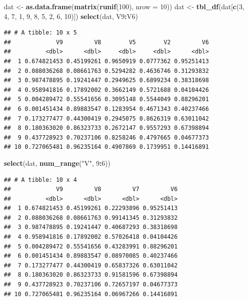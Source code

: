 \documentclass[]{book}
\newenvironment{Shaded}{\begin{snugshade}}{\end{snugshade}}
\newcommand{\KeywordTok}[1]{\textcolor[rgb]{0.13,0.29,0.53}{\textbf{#1}}}
\newcommand{\DataTypeTok}[1]{\textcolor[rgb]{0.13,0.29,0.53}{#1}}
\newcommand{\DecValTok}[1]{\textcolor[rgb]{0.00,0.00,0.81}{#1}}
\newcommand{\StringTok}[1]{\textcolor[rgb]{0.31,0.60,0.02}{#1}}
\newcommand{\OperatorTok}[1]{\textcolor[rgb]{0.81,0.36,0.00}{\textbf{#1}}}
\newcommand{\NormalTok}[1]{#1}
\begin{document}
\begin{Shaded}
\begin{Highlighting}[]
\NormalTok{dat <-}\StringTok{ }\KeywordTok{as.data.frame}\NormalTok{(}\KeywordTok{matrix}\NormalTok{(}\KeywordTok{runif}\NormalTok{(}\DecValTok{100}\NormalTok{), }\DataTypeTok{nrow =} \DecValTok{10}\NormalTok{))}
\NormalTok{dat <-}\StringTok{ }\KeywordTok{tbl_df}\NormalTok{(dat[}\KeywordTok{c}\NormalTok{(}\DecValTok{3}\NormalTok{, }\DecValTok{4}\NormalTok{, }\DecValTok{7}\NormalTok{, }\DecValTok{1}\NormalTok{, }\DecValTok{9}\NormalTok{, }\DecValTok{8}\NormalTok{, }\DecValTok{5}\NormalTok{, }\DecValTok{2}\NormalTok{, }\DecValTok{6}\NormalTok{, }\DecValTok{10}\NormalTok{)])}
\KeywordTok{select}\NormalTok{(dat, V9}\OperatorTok{:}\NormalTok{V6)}
\end{Highlighting}
\end{Shaded}

\begin{verbatim}
## # A tibble: 10 x 5
##             V9         V8        V5        V2         V6
##          <dbl>      <dbl>     <dbl>     <dbl>      <dbl>
##  1 0.674821453 0.45199261 0.9650919 0.0777362 0.95251413
##  2 0.088036268 0.08661763 0.5294282 0.4636746 0.31293832
##  3 0.987478895 0.19241447 0.2949625 0.6899234 0.38318698
##  4 0.958941816 0.17892002 0.3662149 0.5721688 0.04104426
##  5 0.004289472 0.55541656 0.3095148 0.5544049 0.88296201
##  6 0.001451434 0.89883547 0.1283954 0.4671343 0.40237466
##  7 0.173277477 0.44300419 0.2945075 0.8626319 0.63011042
##  8 0.180363020 0.86323733 0.2672147 0.9557293 0.67398894
##  9 0.437728923 0.70237106 0.8258246 0.4797665 0.04677373
## 10 0.727065481 0.96235164 0.4907869 0.1739951 0.14416891
\end{verbatim}

\begin{Shaded}
\begin{Highlighting}[]
\KeywordTok{select}\NormalTok{(dat, }\KeywordTok{num_range}\NormalTok{(}\StringTok{"V"}\NormalTok{, }\DecValTok{9}\OperatorTok{:}\DecValTok{6}\NormalTok{))}
\end{Highlighting}
\end{Shaded}

\begin{verbatim}
## # A tibble: 10 x 4
##             V9         V8         V7         V6
##          <dbl>      <dbl>      <dbl>      <dbl>
##  1 0.674821453 0.45199261 0.22293896 0.95251413
##  2 0.088036268 0.08661763 0.99141345 0.31293832
##  3 0.987478895 0.19241447 0.40687293 0.38318698
##  4 0.958941816 0.17892002 0.57026418 0.04104426
##  5 0.004289472 0.55541656 0.43283991 0.88296201
##  6 0.001451434 0.89883547 0.08970085 0.40237466
##  7 0.173277477 0.44300419 0.65837326 0.63011042
##  8 0.180363020 0.86323733 0.91581596 0.67398894
##  9 0.437728923 0.70237106 0.72657197 0.04677373
## 10 0.727065481 0.96235164 0.06967266 0.14416891
\end{verbatim}
\end{document}
